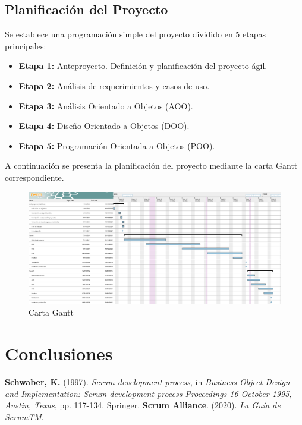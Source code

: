 \documentclass[letterpaper, 10pt]{article}
\begin{document}
\subsection{Planificación del Proyecto}
Se establece una programación simple del proyecto dividido en 5 etapas principales:
\begin{itemize}
	\item \textbf{Etapa 1:} Anteproyecto. Definición y planificación del proyecto ágil.
	\item \textbf{Etapa 2:} Análisis de requerimientos y casos de uso.
	\item \textbf{Etapa 3:} Análisis Orientado a Objetos (AOO).
	\item \textbf{Etapa 4:} Diseño Orientado a Objetos (DOO).
	\item \textbf{Etapa 5:} Programación Orientada a Objetos (POO).
\end{itemize}
%
A continuación se presenta la planificación del proyecto mediante la carta Gantt correspondiente.
%
\begin{figure}[h]
	\centering
	\includegraphics[width=\textwidth]{img/CartaGantt.png}
	\caption{Carta Gantt}
	\label{fig:CartaGantt}
\end{figure}
\clearpage

\section{Conclusiones}



\clearpage
\begin{thebibliography}{a}
     \textbf{Schwaber, K.} (1997). \textit{Scrum development process}, in \textit{Business Object Design and Implementation: Scrum development process Proceedings 16 October 1995, Austin, Texas}, pp. 117-134. Springer.
         \textbf{Scrum Alliance}. (2020). \textit{La Guía de ScrumTM}. 
\end{thebibliography}
\end{document}
